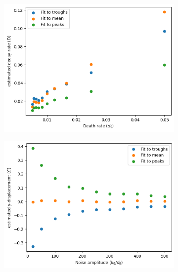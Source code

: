 \begin{figure}
  \begin{subfigure}[t]{0.45\textwidth}
  \centering
    \includegraphics[width=\linewidth]{fhn_deathrate_vs_decay.png}
    \caption{
    }
    \label{fig:acf-fhn-noiseparams-noisetimescale}
  \end{subfigure}%
  \begin{subfigure}[t]{0.45\textwidth}
  \centering
    \includegraphics[width=\linewidth]{fhn_birthrate_vs_ydispl.png}
    \caption{
    }
    \label{fig:acf-fhn-noiseparams-noiseamplitude}
  \end{subfigure}


\end{figure}
